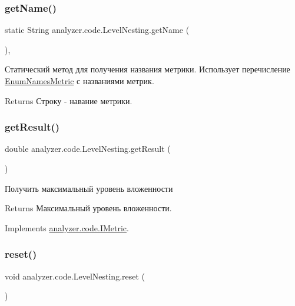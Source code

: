 \subsubsection{\texorpdfstring{get\+Name()}{getName()}}
{\footnotesize\ttfamily static String analyzer.\+code.\+Level\+Nesting.\+get\+Name (\begin{DoxyParamCaption}{ }\end{DoxyParamCaption})\hspace{0.3cm}{\ttfamily [inline]}, {\ttfamily [static]}}

Статический метод для получения названия метрики. Использует перечисление \hyperlink{enumanalyzer_1_1code_1_1EnumNamesMetric}{Enum\+Names\+Metric} с названиями метрик. \begin{DoxyReturn}{Returns}
Строку -\/ навание метрики. 
\end{DoxyReturn}
\mbox{\label{classanalyzer_1_1code_1_1LevelNesting_ab16151c8d69cb40a84d73b2a9574fd85}} 
\subsubsection{\texorpdfstring{get\+Result()}{getResult()}}
{\footnotesize\ttfamily double analyzer.\+code.\+Level\+Nesting.\+get\+Result (\begin{DoxyParamCaption}{ }\end{DoxyParamCaption})\hspace{0.3cm}{\ttfamily [inline]}}

Получить максимальный уровень вложенности \begin{DoxyReturn}{Returns}
Максимальный уровень вложенности. 
\end{DoxyReturn}


Implements \hyperlink{interfaceanalyzer_1_1code_1_1IMetric}{analyzer.\+code.\+I\+Metric}.

\mbox{\label{classanalyzer_1_1code_1_1LevelNesting_a5aeb52565e529607aa8a3b2bd4beb490}} 
\subsubsection{\texorpdfstring{reset()}{reset()}}
{\footnotesize\ttfamily void analyzer.\+code.\+Level\+Nesting.\+reset (\begin{DoxyParamCaption}{ }\end{DoxyParamCaption})\hspace{0.3cm}{\ttfamily [inline]}}

